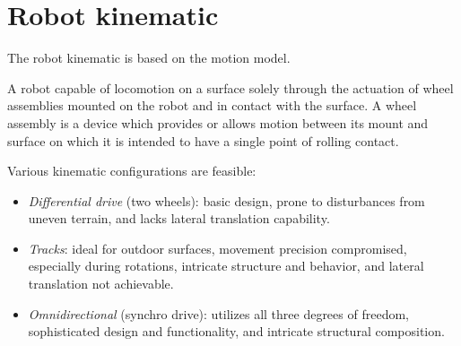 \section{Robot kinematic}

The robot kinematic is based on the motion model. 
\begin{definition}
    A robot capable of locomotion on a surface solely through the actuation of wheel assemblies mounted on the robot and in contact with the surface. 
    A wheel assembly is a device which provides or allows motion between its mount and surface on which it is intended to have a single point of rolling contact.
\end{definition}

Various kinematic configurations are feasible:
\begin{itemize}
    \item \textit{Differential drive} (two wheels): basic design, prone to disturbances from uneven terrain, and lacks lateral translation capability.
    \item \textit{Tracks}: ideal for outdoor surfaces, movement precision compromised, especially during rotations, intricate structure and behavior, and lateral translation not achievable.
    \item \textit{Omnidirectional} (synchro drive): utilizes all three degrees of freedom, sophisticated design and functionality, and intricate structural composition.
\end{itemize}
